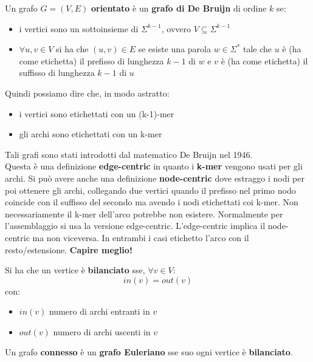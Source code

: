 \documentclass[a4paper,12pt, oneside]{book}
\begin{document}
\begin{definizione}
  Un grafo $G=(V,E)$ \textbf{orientato} è un \textbf{grafo di De Bruijn} di
  ordine $k$ se:
  \begin{itemize}
    \item i vertici sono un sottoinsieme di $\Sigma^{k-1}$, ovvero $V\subseteq
    \Sigma^{k-1}$ 
    \item $\forall u,v\in V$ si ha che $(u,v)\in E$ se esiste una parola $w\in
    \Sigma^*$ tale che $u$ è (ha come etichetta) il prefisso di lunghezza $k-1$
    di $w$ e $v$ è (ha come etichetta) il suffisso di lunghezza $k-1$ di $u$ 
  \end{itemize}
  Quindi possiamo dire che, in modo astratto:
  \begin{itemize}
    \item i vertici sono etichettati con un (k-1)-mer
    \item gli archi sono etichettati con un k-mer
  \end{itemize}
  Tali grafi sono stati introdotti dal matematico De Bruijn nel 1946.\\
  Questa è una definizione \textbf{edge-centric} in quanto i \textbf{k-mer}
  vengono usati per gli archi. Si può avere anche una definizione
  \textbf{node-centric} dove estraggo i nodi per poi ottenere gli archi,
  collegando due vertici quando il prefisso nel primo nodo coincide con il
  suffisso del secondo ma avendo i nodi etichettati coi k-mer. Non
  necessariamente il k-mer dell'arco potrebbe non esistere. Normalmente per
  l'assemblaggio si usa la versione edge-centric. L'edge-centric implica il
  node-centric ma non viceversa. In entrambi i casi etichetto l'arco con il
  resto/estensione. \textbf{Capire meglio!}
\end{definizione}
\begin{definizione}
  Si ha che un vertice è \textbf{bilanciato} sse, $\forall v\in V$:
  \[in(v)=out(v)\]
  con:
  \begin{itemize}
    \item $in(v)$ numero di archi entranti in $v$
    \item $out(v)$ numero di archi uscenti in $v$
  \end{itemize}
\end{definizione}
\begin{teorema}
  Un grafo \textbf{connesso} è un \textbf{grafo Euleriano} sse suo ogni vertice
  è \textbf{bilanciato}. 
\end{teorema}
\end{document}
